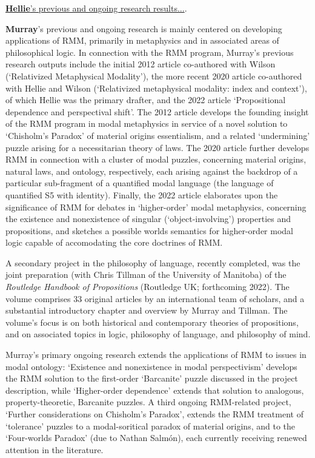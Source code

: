 \documentclass[12pt]{article}
\begin{document}
\ul{\textbf{Hellie}'s previous and ongoing research results...}.  

\textbf{Murray}'s previous and ongoing research is mainly centered on
developing applications of RMM, primarily in metaphysics and in associated
areas of philosophical logic. 
In connection with the RMM program, Murray's previous research outputs include
the initial 2012 article co-authored with Wilson (`Relativized Metaphysical
Modality'), the more recent 2020 article co-authored with Hellie and
Wilson (`Relativized metaphysical modality: index and context'), of which
Hellie was the primary drafter, and the 2022 article `Propositional dependence
and perspectival shift'. The 2012 article develops the founding
insight of the RMM program in modal metaphysics in service of a novel solution
to `Chisholm's Paradox' of material origins essentialism, and a related
`undermining' puzzle arising for a necessitarian theory of laws.  The 2020 
article further develops RMM in connection with a cluster of modal puzzles,
concerning material origins, natural laws, and ontology, respectively, each
arising against the backdrop of a particular sub-fragment of a quantified
modal language (the language of quantified S5 with identity). Finally, the
2022 article elaborates
upon the significance of RMM for debates in `higher-order' modal metaphysics,
concerning the existence and nonexistence of singular (`object-involving')
properties and propositions, and sketches a possible worlds
semantics for higher-order modal logic capable of accomodating the core
doctrines of RMM. 

A secondary project in the philosophy of
language, recently completed, was the joint preparation (with Chris Tillman of
the University of Manitoba) of the \emph{Routledge Handbook of Propositions}
(Routledge UK; forthcoming 2022). The volume comprises 33 original articles by
an international team of scholars, and a substantial introductory chapter and
overview by
Murray and Tillman. The volume's focus is  on both historical and contemporary
theories of propositions, and on associated topics in logic, philosophy of
language, and philosophy of mind. 

Murray's primary ongoing research extends the applications of RMM to issues in
modal ontology: `Existence and
nonexistence in modal perspectivism' develops the RMM solution to the
first-order `Barcanite' puzzle discussed in the project description, while
`Higher-order dependence' extends that solution to analogous,
property-theoretic, Barcanite puzzles. 
A third ongoing RMM-related project, `Further considerations on
Chisholm's Paradox', extends the RMM treatment of `tolerance' puzzles to
a modal-soritical paradox of material origins, and to the `Four-worlds
Paradox' (due to Nathan Salm\'{o}n), each currently receiving renewed attention in the literature. 
\end{document}
